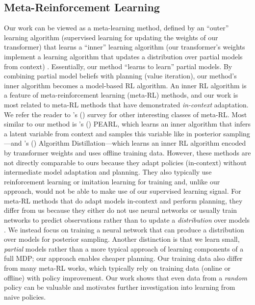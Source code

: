 \documentclass[sigconf]{aamas}
\begin{document}
\subsection{Meta-Reinforcement Learning} Our work can be viewed as a meta-learning method, defined by an ``outer'' learning algorithm (supervised learning for updating the weights of our transformer) that learns a ``inner'' learning algorithm (our transformer's weights implement a learning algorithm that updates a distribution over partial models from context) \cite{hospedalesMetaLearningNeuralNetworks2022}. Essentially, our method ``learns to learn'' partial models. By combining partial model beliefs with planning (value iteration), our method's inner algorithm becomes a model-based RL algorithm. An inner RL algorithm is a feature of meta-reinforcement learning (meta-RL) methods, and our work is most related to meta-RL methods that have demonstrated \textit{in-context} adaptation. We refer the reader to \citeauthor{hospedalesMetaLearningNeuralNetworks2022}'s (\citeyear{hospedalesMetaLearningNeuralNetworks2022}) survey for other interesting classes of meta-RL.
Most similar to our method is \citeauthor{rakellyEfficientOffPolicyMetaReinforcement2019}'s (\citeyear{rakellyEfficientOffPolicyMetaReinforcement2019}) PEARL, which learns an inner algorithm that infers a latent variable from context and samples this variable like in posterior sampling---and \citeauthor{laskinIncontextReinforcementLearning2022}'s (\citeyear{laskinIncontextReinforcementLearning2022}) Algorithm Distillation---which learns an inner RL algorithm encoded by transformer weights and uses offline training data. However, these methods \citep[along with others like:][]{wangLearningReinforcementLearn2016,duanRLFastReinforcement2016,zintgrafVariBADVariationalBayesAdaptive2021} are not directly comparable to ours because they adapt policies (in-context) without intermediate model adaptation and planning. They also typically use reinforcement learning or imitation learning for training and, unlike our approach, would not be able to make use of our supervised learning signal.
For meta-RL methods that do adapt models in-context and perform planning, they differ from us because they either do not use neural networks \citep[e.g.,][]{saemundssonMetaReinforcementLearning2018} or usually train networks to predict observations rather than to update a \textit{distribution} over models \citep[e.g.,][]{nagabandiLearningAdaptDynamic2019,weinsteinStructureLearningMotor2017}. We instead focus on training a neural network that can produce a distribution over models for posterior sampling. Another distinction is that we learn small, \textit{partial} models rather than a more typical approach of learning components of a full MDP; our approach enables cheaper planning.
Our training data also differ from many meta-RL works, which typically rely on training data (online or offline) with policy improvement. Our work shows that even data from a \textit{random} policy can be valuable and motivates further investigation into learning from naive policies.
\end{document}
